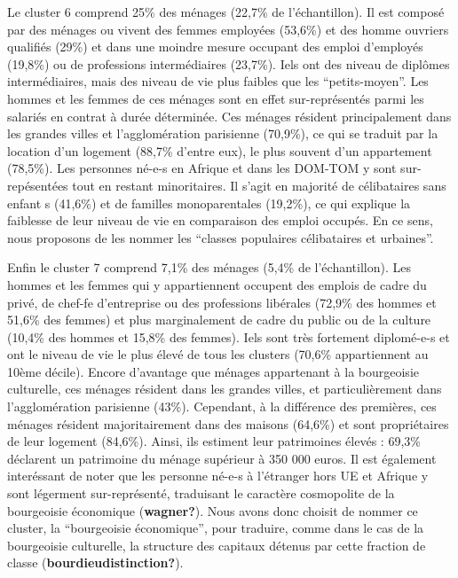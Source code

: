 \documentclass[
  12pt,
]{book}
\begin{document}
Le cluster 6 comprend 25\% des ménages (22,7\% de l'échantillon). Il est
composé par des ménages ou vivent des femmes employées (53,6\%) et des
homme ouvriers qualifiés (29\%) et dans une moindre mesure occupant des
emploi d'employés (19,8\%) ou de professions intermédiaires (23,7\%).
Iels ont des niveau de diplômes intermédiaires, mais des niveau de vie
plus faibles que les ``petits-moyen''. Les hommes et les femmes de ces
ménages sont en effet sur-représentés parmi les salariés en contrat à
durée déterminée. Ces ménages résident principalement dans les grandes
villes et l'agglomération parisienne (70,9\%), ce qui se traduit par la
location d'un logement (88,7\% d'entre eux), le plus souvent d'un
appartement (78,5\%). Les personnes né-e-s en Afrique et dans les
DOM-TOM y sont sur-repésentées tout en restant minoritaires. Il s'agit
en majorité de célibataires sans enfant s (41,6\%) et de familles
monoparentales (19,2\%), ce qui explique la faiblesse de leur niveau de
vie en comparaison des emploi occupés. En ce sens, nous proposons de les
nommer les ``classes populaires célibataires et urbaines''.

Enfin le cluster 7 comprend 7,1\% des ménages (5,4\% de l'échantillon).
Les hommes et les femmes qui y appartiennent occupent des emplois de
cadre du privé, de chef-fe d'entreprise ou des professions libérales
(72,9\% des hommes et 51,6\% des femmes) et plus marginalement de cadre
du public ou de la culture (10,4\% des hommes et 15,8\% des femmes).
Iels sont très fortement diplomé-e-s et ont le niveau de vie le plus
élevé de tous les clusters (70,6\% appartiennent au 10ème décile).
Encore d'avantage que ménages appartenant à la bourgeoisie culturelle,
ces ménages résident dans les grandes villes, et particulièrement dans
l'agglomération parisienne (43\%). Cependant, à la différence des
premières, ces ménages résident majoritairement dans des maisons
(64,6\%) et sont propriétaires de leur logement (84,6\%). Ainsi, ils
estiment leur patrimoines élevés : 69,3\% déclarent un patrimoine du
ménage supérieur à 350 000 euros. Il est également interéssant de noter
que les personne né-e-s à l'étranger hors UE et Afrique y sont légerment
sur-représenté, traduisant le caractère cosmopolite de la bourgeoisie
économique (\textbf{wagner?}). Nous avons donc choisit de nommer ce
cluster, la ``bourgeoisie économique'', pour traduire, comme dans le cas
de la bourgeoisie culturelle, la structure des capitaux détenus par
cette fraction de classe (\textbf{bourdieudistinction?}).
\end{document}
